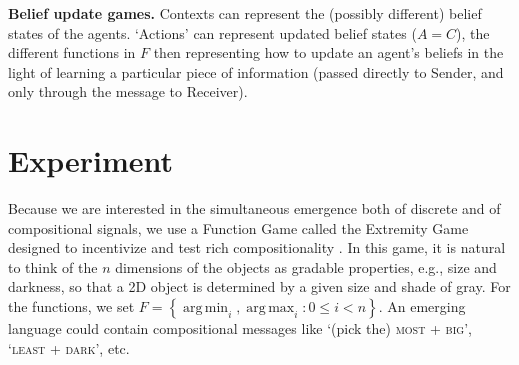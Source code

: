 \documentclass[11pt,a4paper]{article}
\DeclareMathOperator*{\argmax}{arg\,max}
\DeclareMathOperator*{\argmin}{arg\,min}
\newcommand{\nbSST}[1]{{\leavevmode\color{violet}{\scriptsize#1}}}
\begin{document}
\noindent \textbf{Belief update games.} Contexts can represent the (possibly different) belief states of the agents. `Actions' can represent updated belief states ($A = C$), the different functions in $F$ then representing how to update an agent's beliefs in the light of learning a particular piece of information (passed directly to Sender, and only through the message to Receiver). 



\section{Experiment}

Because we are interested in the simultaneous emergence both of discrete and of compositional signals, we use a Function Game called the Extremity Game designed to incentivize and test rich compositionality \citep{Steinert-Threlkeld2019}. In this game, it is natural to think of the $n$ dimensions of the objects as gradable properties, e.g., size and darkness, so that a 2D object is determined by a given size and shade of gray. For the functions, we set $F = \left\{ \argmin_i , \argmax_i : 0 \leq i < n \right\}$. An emerging language could contain compositional messages like `(pick the) \textsc{most} + \textsc{big}', `\textsc{least} + \textsc{dark}', etc.


\end{document}
